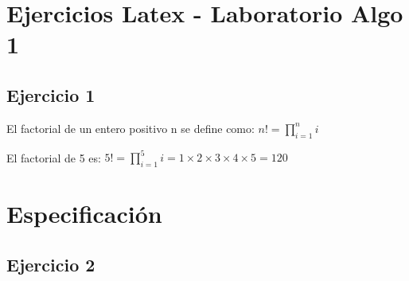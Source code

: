 \documentclass{article}
\begin{document}
	
	\section*{Ejercicios Latex - Laboratorio Algo 1}
	
	\subsection*{Ejercicio 1}
	
	El factorial de un entero positivo n se define como: 
	$ n! = \prod_{i = 1}^n i $  \par
	El factorial de 5 es: 
	$ 5! = \prod_{i = 1}^5 i = 1 \times 2 \times 3 \times 4 \times 5 = 120 $
	
	\section*{Especificación}
	\subsection*{Ejercicio 2}
	

	
	
	
\end{document}
